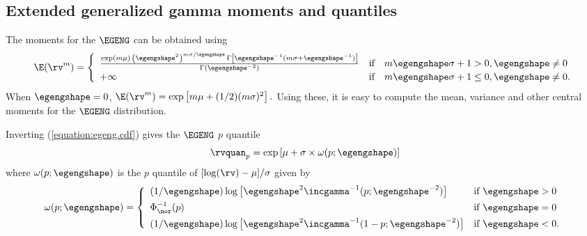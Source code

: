 \subsection{Extended generalized gamma moments and quantiles}
The moments for the $\EGENG$ can be
obtained using
\begin{displaymath}
\displaystyle
\E(\rv^{m})=
\left \{
\begin{array}{lll} \frac{
	          {\exp(m \mu) \, \left ( 
			\egengshape^{2}
			\right )^{m \sigma/\egengshape}
                    \, \Gamma
		         \left [\egengshape^{-1}(
			m \sigma + \egengshape^{-1})
			 \right]
	          }
		       }
		  {
		   \Gamma(\egengshape^{-2})
		  }
&\mbox{if} & m\egengshape \sigma+ 1>0, \egengshape \ne 0
\\
+\infty     & \mbox{if}&  m\egengshape \sigma + 1 \le 0,\egengshape \ne 0 .
\end{array}
\right.
\end{displaymath} 
When $\egengshape = 0$, $\E(\rv^{m})=\exp \left [m \mu+ (1/2)(m
\sigma)^{2} \right ].$ Using these, it is easy to compute the mean,
variance and other central moments for the $\EGENG$ distribution.

Inverting (\ref{equation:egeng.cdf}) gives the $\EGENG$ $p$ quantile
\begin{displaymath}
\rvquan_{p}=\exp \left [
\mu+\sigma \times \omega(p;\egengshape)
                 \right ]
\end{displaymath}
where $\omega(p;\egengshape)$ is the $p$ quantile
of $[\log(\rv)-\mu]/\sigma$ given by
\begin{displaymath}
\omega(p;\egengshape)=
\left \{
\begin{array}{ll}
(1/{\egengshape})\log \left[
 {\egengshape}^{2} \incgamma^{-1}(p; \egengshape^{-2})
     \right ]
& \mbox{if $\egengshape>0$}
\\[1ex]
\Phi_{\nor}^{-1}(p)
& \mbox{if $\egengshape=0$}
\\[1ex]
(1/{\egengshape})\log \left[
 {\egengshape}^{2} \incgamma^{-1}(1-p; \egengshape^{-2})
     \right ]
& \mbox{if $\egengshape<0$}.
\end{array}
\right.
\end{displaymath}


